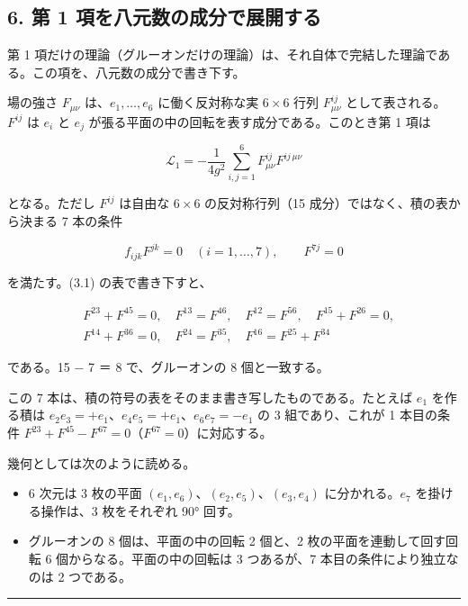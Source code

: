 \documentclass[
  a4paper,
]{ltjsarticle}
\providecommand{\tightlist}{%
  \setlength{\itemsep}{0pt}\setlength{\parskip}{0pt}}
\begin{document}
\subsection{6. 第 1
項を八元数の成分で展開する}\label{ux7b2c-1-ux9805ux3092ux516bux5143ux6570ux306eux6210ux5206ux3067ux5c55ux958bux3059ux308b}

第 1
項だけの理論（グルーオンだけの理論）は、それ自体で完結した理論である。この項を、八元数の成分で書き下す。

場の強さ \(F_{\mu\nu}\) は、\(e_1, \dots, e_6\) に働く反対称な実
\(6\times6\) 行列 \(F^{ij}_{\mu\nu}\) として表される。\(F^{ij}\) は
\(e_i\) と \(e_j\) が張る平面の中の回転を表す成分である。このとき第 1
項は

\[
\mathcal{L}_1 = -\frac{1}{4g^2}\sum_{i,j=1}^{6} F^{ij}_{\mu\nu}F^{ij\,\mu\nu} \tag{6.1}
\]

となる。ただし \(F^{ij}\) は自由な \(6\times6\) の反対称行列（15
成分）ではなく、積の表から決まる 7 本の条件

\[
f_{ijk}F^{jk} = 0\quad(i = 1, \dots, 7),\qquad F^{7j} = 0 \tag{6.2}
\]

を満たす。(3.1) の表で書き下すと、

\[
\begin{aligned}
&F^{23} + F^{45} = 0,\quad F^{13} = F^{46},\quad F^{12} = F^{56},\quad F^{15} + F^{26} = 0,\\
&F^{14} + F^{36} = 0,\quad F^{24} = F^{35},\quad F^{16} = F^{25} + F^{34}
\end{aligned}
\]

である。15 − 7 ＝ 8 で、グルーオンの 8 個と一致する。

この 7 本は、積の符号の表をそのまま書き写したものである。たとえば
\(e_1\) を作る積は
\(e_2e_3 = +e_1\)、\(e_4e_5 = +e_1\)、\(e_6e_7 = -e_1\) の 3
組であり、これが 1 本目の条件
\(F^{23} + F^{45} - F^{67} = 0\)（\(F^{67} = 0\)）に対応する。

幾何としては次のように読める。

\begin{itemize}
\tightlist
\item
  6 次元は 3 枚の平面 \((e_1, e_6)\)、\((e_2, e_5)\)、\((e_3, e_4)\)
  に分かれる。\(e_7\) を掛ける操作は、3 枚をそれぞれ 90° 回す。
\item
  グルーオンの 8 個は、平面の中の回転 2 個と、2
  枚の平面を連動して回す回転 6 個からなる。平面の中の回転は 3
  つあるが、7 本目の条件により独立なのは 2 つである。
\end{itemize}

\begin{center}\rule{0.5\linewidth}{0.5pt}\end{center}
\end{document}
